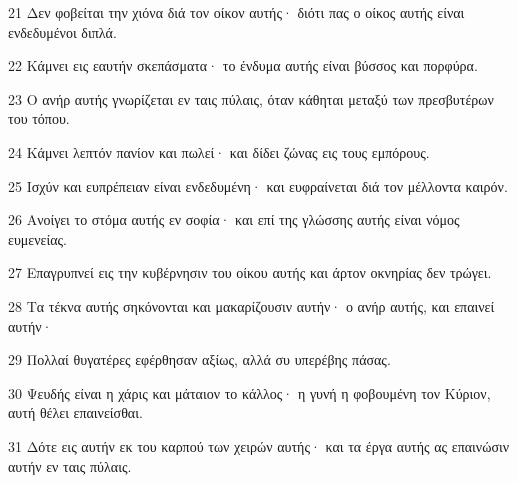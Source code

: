 \par 21 Δεν φοβείται την χιόνα διά τον οίκον αυτής· διότι πας ο οίκος αυτής είναι ενδεδυμένοι διπλά.
\par 22 Κάμνει εις εαυτήν σκεπάσματα· το ένδυμα αυτής είναι βύσσος και πορφύρα.
\par 23 Ο ανήρ αυτής γνωρίζεται εν ταις πύλαις, όταν κάθηται μεταξύ των πρεσβυτέρων του τόπου.
\par 24 Κάμνει λεπτόν πανίον και πωλεί· και δίδει ζώνας εις τους εμπόρους.
\par 25 Ισχύν και ευπρέπειαν είναι ενδεδυμένη· και ευφραίνεται διά τον μέλλοντα καιρόν.
\par 26 Ανοίγει το στόμα αυτής εν σοφία· και επί της γλώσσης αυτής είναι νόμος ευμενείας.
\par 27 Επαγρυπνεί εις την κυβέρνησιν του οίκου αυτής και άρτον οκνηρίας δεν τρώγει.
\par 28 Τα τέκνα αυτής σηκόνονται και μακαρίζουσιν αυτήν· ο ανήρ αυτής, και επαινεί αυτήν·
\par 29 Πολλαί θυγατέρες εφέρθησαν αξίως, αλλά συ υπερέβης πάσας.
\par 30 Ψευδής είναι η χάρις και μάταιον το κάλλος· η γυνή η φοβουμένη τον Κύριον, αυτή θέλει επαινείσθαι.
\par 31 Δότε εις αυτήν εκ του καρπού των χειρών αυτής· και τα έργα αυτής ας επαινώσιν αυτήν εν ταις πύλαις.


